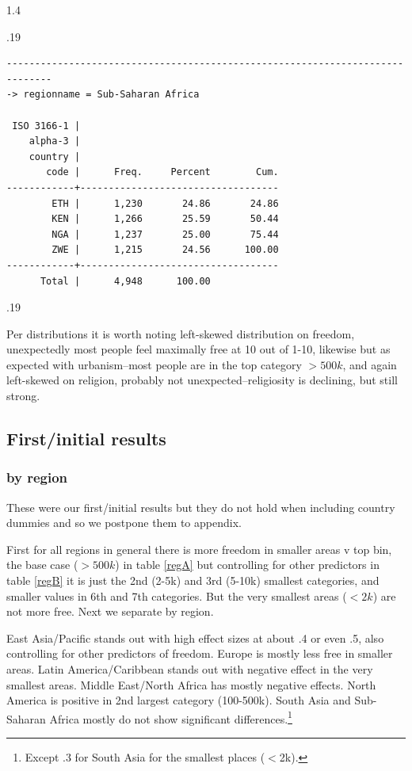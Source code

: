 \documentclass[10pt, letterpaper]{article}
\begin{document}
\begin{spacing}{1.4}
\begin{scriptsize}
\begin{spacing}{.19}
\begin{verbatim}
------------------------------------------------------------------------------
-> regionname = Sub-Saharan Africa

 ISO 3166-1 |
    alpha-3 |
    country |
       code |      Freq.     Percent        Cum.
------------+-----------------------------------
        ETH |      1,230       24.86       24.86
        KEN |      1,266       25.59       50.44
        NGA |      1,237       25.00       75.44
        ZWE |      1,215       24.56      100.00
------------+-----------------------------------
      Total |      4,948      100.00

\end{verbatim}
\end{spacing}{.19}
\end{scriptsize}




Per distributions it is worth noting left-skewed distribution on freedom,
unexpectedly most people feel maximally free at 10 out of 1-10, likewise but as expected with
urbanism--most people are in the top category $>500k$, and again left-skewed on
religion, probably not unexpected--religiosity is declining, but still
strong. 



\subsection{First/initial results}
\subsubsection{by region}

These were our first/initial results but they do not hold when including country
dummies and so we postpone them to appendix. 

First for all regions in general there is more freedom in smaller areas v top
bin, the base case ($>500k$) in table \ref{regA} but controlling for other
predictors in table \ref{regB} it is just the 2nd (2-5k) and 3rd (5-10k)
smallest categories, and smaller values in 6th and 7th categories.
But the very smallest areas ($<2k$) are not more free.  
 Next we separate by region.

East Asia/Pacific stands out with high effect sizes at about .4 or even .5, also
controlling for other predictors of freedom. Europe is mostly less free in
smaller areas. Latin America/Caribbean
stands out with negative effect in the very smallest areas. Middle East/North
Africa has mostly negative effects. North America is positive in 2nd largest
category (100-500k). South Asia and Sub-Saharan Africa mostly do not show significant
differences.\footnote{Except .3 for South Asia for the smallest places ($<$2k). %
} 


\end{spacing}
\end{document}
